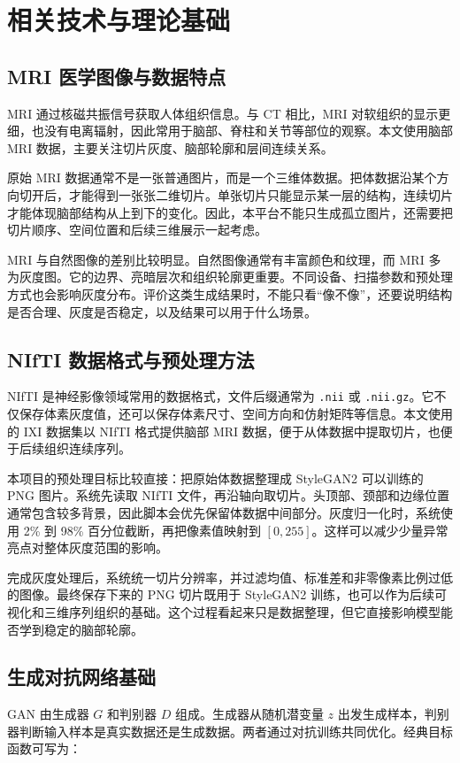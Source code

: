 \chapter{相关技术与理论基础}

\section{MRI 医学图像与数据特点}
MRI 通过核磁共振信号获取人体组织信息。与 CT 相比，MRI 对软组织的显示更细，也没有电离辐射，因此常用于脑部、脊柱和关节等部位的观察。本文使用脑部 MRI 数据，主要关注切片灰度、脑部轮廓和层间连续关系。

原始 MRI 数据通常不是一张普通图片，而是一个三维体数据。把体数据沿某个方向切开后，才能得到一张张二维切片。单张切片只能显示某一层的结构，连续切片才能体现脑部结构从上到下的变化。因此，本平台不能只生成孤立图片，还需要把切片顺序、空间位置和后续三维展示一起考虑。

MRI 与自然图像的差别比较明显。自然图像通常有丰富颜色和纹理，而 MRI 多为灰度图。它的边界、亮暗层次和组织轮廓更重要。不同设备、扫描参数和预处理方式也会影响灰度分布。评价这类生成结果时，不能只看“像不像”，还要说明结构是否合理、灰度是否稳定，以及结果可以用于什么场景。

\section{NIfTI 数据格式与预处理方法}
NIfTI 是神经影像领域常用的数据格式，文件后缀通常为 \texttt{.nii} 或 \texttt{.nii.gz}。它不仅保存体素灰度值，还可以保存体素尺寸、空间方向和仿射矩阵等信息\cite{nifti2004}。本文使用的 IXI 数据集以 NIfTI 格式提供脑部 MRI 数据，便于从体数据中提取切片，也便于后续组织连续序列\cite{ixiDataset}。

本项目的预处理目标比较直接：把原始体数据整理成 StyleGAN2 可以训练的 PNG 图片。系统先读取 NIfTI 文件，再沿轴向取切片。头顶部、颈部和边缘位置通常包含较多背景，因此脚本会优先保留体数据中间部分。灰度归一化时，系统使用 2\% 到 98\% 百分位截断，再把像素值映射到 $[0,255]$。这样可以减少少量异常亮点对整体灰度范围的影响。

完成灰度处理后，系统统一切片分辨率，并过滤均值、标准差和非零像素比例过低的图像。最终保存下来的 PNG 切片既用于 StyleGAN2 训练，也可以作为后续可视化和三维序列组织的基础。这个过程看起来只是数据整理，但它直接影响模型能否学到稳定的脑部轮廓。

\section{生成对抗网络基础}
GAN 由生成器 $G$ 和判别器 $D$ 组成。生成器从随机潜变量 $z$ 出发生成样本，判别器判断输入样本是真实数据还是生成数据。两者通过对抗训练共同优化。经典目标函数可写为：

